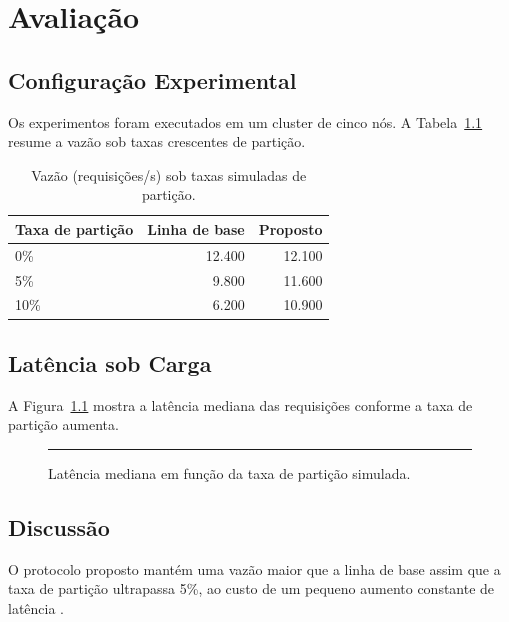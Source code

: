 \chapter{Avalia\c{c}\~ao}
\label{ch:avaliacao}

\section{Configura\c{c}\~ao Experimental}

Os experimentos foram executados em um cluster de cinco n\'os. A
Tabela~\ref{tab:resultados} resume a vaz\~ao sob taxas crescentes de
parti\c{c}\~ao.

\begin{table}[htbp]
  \centering
  \caption{Vaz\~ao (requisi\c{c}\~oes/s) sob taxas simuladas de parti\c{c}\~ao.}
  \label{tab:resultados}
  \begin{tabular}{@{}lrr@{}}
    \toprule
    Taxa de parti\c{c}\~ao & Linha de base & Proposto \\
    \midrule
    0\%  & 12.400 & 12.100 \\
    5\%  & 9.800  & 11.600 \\
    10\% & 6.200  & 10.900 \\
    \bottomrule
  \end{tabular}
\end{table}

\section{Lat\^encia sob Carga}

A Figura~\ref{fig:latencia} mostra a lat\^encia mediana das
requisi\c{c}\~oes conforme a taxa de parti\c{c}\~ao aumenta.

\begin{figure}[htbp]
  \centering
  \rule{0.6\textwidth}{4cm}
  \caption{Lat\^encia mediana em fun\c{c}\~ao da taxa de parti\c{c}\~ao simulada.}
  \label{fig:latencia}
\end{figure}

\section{Discuss\~ao}

O protocolo proposto mant\'em uma vaz\~ao maior que a linha de base
assim que a taxa de parti\c{c}\~ao ultrapassa 5\%, ao custo de um
pequeno aumento constante de lat\^encia \cite{ongaro2014search}.
